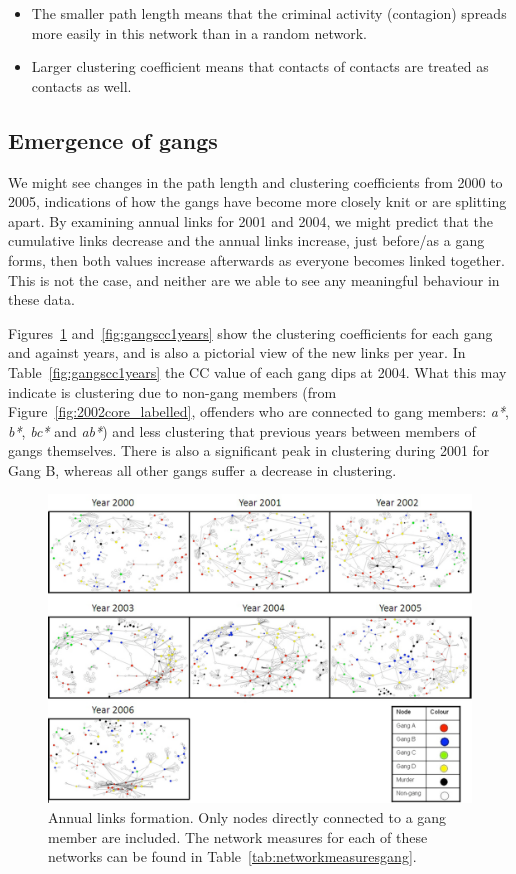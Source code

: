 \documentclass[twocolumn]{svjour3}          %
\theoremstyle{definition}
\begin{document}
\begin{itemize}
\item The smaller path length means that the criminal activity
(contagion) spreads more easily in this network than in a random
network.
\item Larger clustering coefficient means that contacts of contacts
are treated as contacts as well.
\end{itemize}


\subsection{Emergence of gangs}\label{sec:emergence}
We might see changes in the path length and clustering
coefficients from 2000 to 2005, indications of how the gangs have
become more closely knit or are splitting apart. By examining annual
links for 2001 and 2004, we might predict that the cumulative links
decrease and the annual links increase, just before/as a gang forms,
then both values increase afterwards as everyone becomes linked
together. This is not the case, and neither are we able to see any
meaningful behaviour in these data.

Figures~\ref{fig:all} and~\ref{fig:gangscc1years} show the clustering
coefficients for each gang and against years, and is also a pictorial
view of the new links per year. In Table~\ref{fig:gangscc1years} the
CC value of each gang dips at 2004. What this may indicate is
clustering due to non-gang members (from
Figure~\ref{fig:2002core_labelled}, offenders who are connected to
gang members: \emph{a*}, \emph{b*}, \emph{bc*} and \emph{ab*}) and
less clustering that previous years between members of gangs
themselves. There is also a significant peak in clustering during 2001
for Gang B, whereas all other gangs suffer a decrease in clustering.


\begin{figure}[!ht]
\centering
\includegraphics[width=\textwidth]{images/all}
\caption{Annual links formation. Only nodes directly connected to a gang member are included. The network measures for each of these networks can be found in Table~\ref{tab:networkmeasuresgang}.}
\label{fig:all}
\end{figure}
\end{document}
